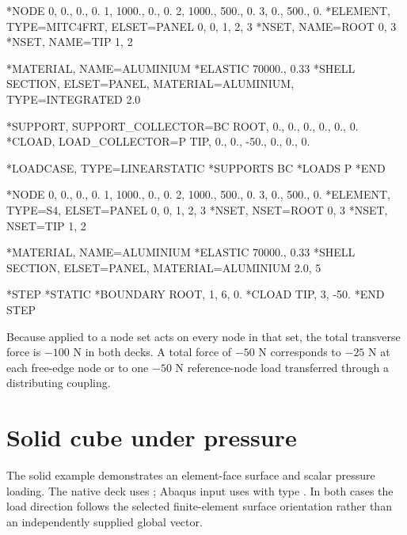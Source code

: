 \begin{dialectexamples}
\begin{femasterdeck}
*NODE
0,    0.,   0., 0.
1, 1000.,   0., 0.
2, 1000., 500., 0.
3,    0., 500., 0.
*ELEMENT, TYPE=MITC4FRT, ELSET=PANEL
0, 0, 1, 2, 3
*NSET, NAME=ROOT
0, 3
*NSET, NAME=TIP
1, 2

*MATERIAL, NAME=ALUMINIUM
*ELASTIC
70000., 0.33
*SHELL SECTION, ELSET=PANEL,
 MATERIAL=ALUMINIUM, TYPE=INTEGRATED
2.0

*SUPPORT, SUPPORT_COLLECTOR=BC
ROOT, 0., 0., 0., 0., 0., 0.
*CLOAD, LOAD_COLLECTOR=P
TIP, 0., 0., -50., 0., 0., 0.

*LOADCASE, TYPE=LINEARSTATIC
*SUPPORTS
BC
*LOADS
P
*END
\end{femasterdeck}
\begin{abaqusdeck}
*NODE
0,    0.,   0., 0.
1, 1000.,   0., 0.
2, 1000., 500., 0.
3,    0., 500., 0.
*ELEMENT, TYPE=S4, ELSET=PANEL
0, 0, 1, 2, 3
*NSET, NSET=ROOT
0, 3
*NSET, NSET=TIP
1, 2

*MATERIAL, NAME=ALUMINIUM
*ELASTIC
70000., 0.33
*SHELL SECTION, ELSET=PANEL,
 MATERIAL=ALUMINIUM
2.0, 5

*STEP
*STATIC
*BOUNDARY
ROOT, 1, 6, 0.
*CLOAD
TIP, 3, -50.
*END STEP
\end{abaqusdeck}
\end{dialectexamples}

Because  applied to a node set acts on every node in that set, the total transverse force is \(-100\) N in both decks. A total force of \(-50\) N corresponds to \(-25\) N at each free-edge node or to one \(-50\) N reference-node load transferred through a distributing coupling.

\section{Solid cube under pressure}

The solid example demonstrates an element-face surface and scalar pressure loading. The native deck uses ; Abaqus input uses  with type . In both cases the load direction follows the selected finite-element surface orientation rather than an independently supplied global vector.

